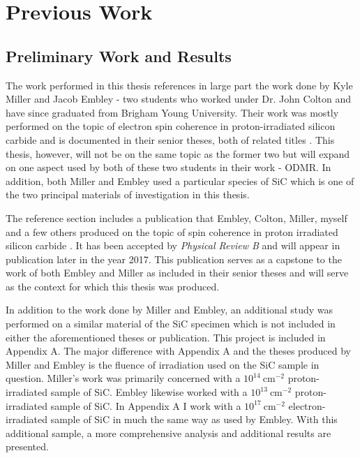 \documentclass[oneside, noacknowlegments]{BYUPhys}
\begin{document}
\section{Previous Work}

\subsection{Preliminary Work and Results}

The work performed in this thesis references in large part the work done by Kyle Miller and Jacob Embley - two students who worked under Dr. John Colton and have since graduated from Brigham Young University. Their work was mostly performed on the topic of electron spin coherence in proton-irradiated silicon carbide and is documented in their senior theses, both of related titles \cite{RefWorks:doc:5892989ee4b0499fa95c51c8} \cite{RefWorks:doc:5892912ae4b0dec22aee3993}. This thesis, however, will not be on the same topic as the former two but will expand on one aspect used by both of these two students in their work - ODMR. In addition, both Miller and Embley used a particular species of SiC which is one of the two principal materials of investigation in this thesis.

The reference section includes a publication that Embley, Colton, Miller, myself and a few others produced on the topic of spin coherence in proton irradiated silicon carbide \cite{RefWorks:doc:58929128e4b0499fa95c5064}. It has been accepted by \textit{Physical Review B} and will appear in publication later in the year 2017. This publication serves as a capstone to the work of both Embley and Miller as included in their senior theses and will serve as the context for which this thesis was produced.

In addition to the work done by Miller and Embley, an additional study was performed on a similar material of the SiC specimen which is not included in either the aforementioned theses or publication. This project is included in Appendix A. The major difference with Appendix A and the theses produced by Miller and Embley is the fluence of irradiation used on the SiC sample in question. Miller's work was primarily concerned with a $10^{14}~\text{cm}^{-2}$ proton-irradiated sample of SiC. Embley likewise worked with a $10^{13}~\text{cm}^{-2}$ proton-irradiated sample of SiC. In Appendix A I work with a $10^{17}~\text{cm}^{-2}$ electron-irradiated sample of SiC in much the same way as used by Embley. With this additional sample, a more comprehensive analysis and additional results are presented.
\end{document}
